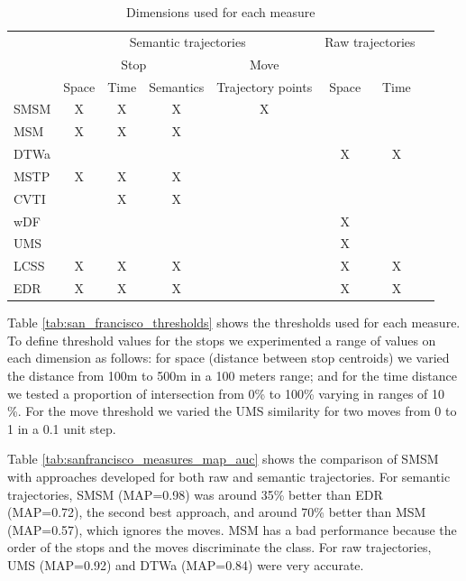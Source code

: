 \documentclass[12pt]{article}
\begin{document}
\begin{table}[!h]
\scriptsize
  \centering
  \begin{tabular}{|l|c|c|c|c|c|c|c|}
  	\hline
  & \multicolumn{4}{c|}{Semantic trajectories} & \multicolumn{2}{c|}{Raw trajectories} \\
 	\cline{2-5}
  & \multicolumn{3}{c|}{Stop} & \multicolumn{1}{c|}{Move} & \multicolumn{2}{c|}{} \\
 	\cline{2-7}
  & Space & Time & Semantics & Trajectory points & Space & Time\\
  	\hline
 SMSM & X & X & X & X & & \\
 MSM & X & X & X & & & \\
 DTWa &  &  &  & & X & X \\
 MSTP & X & X & X & & & \\
 CVTI & & X & X & & & \\
 wDF & & & & & X & \\
 UMS & & & & & X & \\
 LCSS & X & X & X & & X & X \\
 EDR & X & X & X & & X & X \\
    \hline
  \end{tabular}
  \caption{Dimensions used for each measure}
  \label{tab:san_francisco_measures}
\end{table}

Table \ref{tab:san_francisco_thresholds} shows the  thresholds used for each measure. To define threshold values for the stops we experimented  a range of values on each dimension as follows: for space (distance between stop centroids) we varied the distance from 100m to 500m in a 100 meters range; and for the time distance we tested a proportion of intersection from 0\% to 100\% varying in ranges of 10 \%. For the move threshold we varied the  UMS similarity for two moves from 0 to 1 in a 0.1 unit step.

{Table {\ref{tab:sanfrancisco_measures_map_auc}} shows the comparison of SMSM with approaches developed for both raw and semantic trajectories.
For semantic trajectories, SMSM (MAP=0.98) was around 35\% better than EDR (MAP=0.72), the second best approach, and around 70\% better than MSM (MAP=0.57), which ignores the moves. MSM has a bad performance because the order of the stops and the moves discriminate the class. For raw trajectories, UMS (MAP=0.92) and DTWa (MAP=0.84) were  very accurate.}
\end{document}

